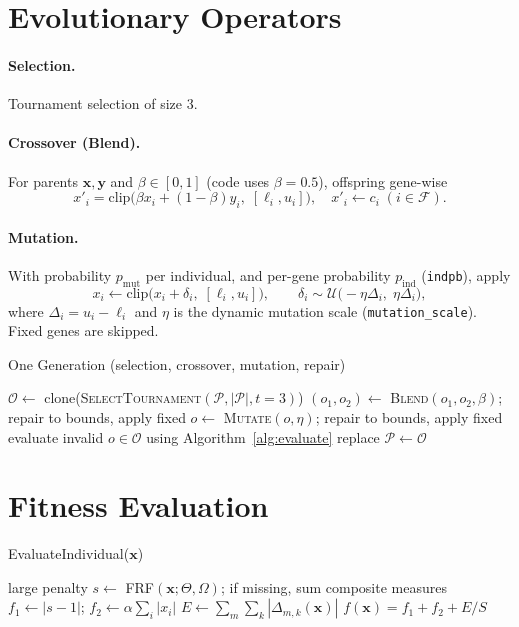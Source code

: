 \documentclass[12pt,a4paper]{article}
\begin{document}
\section{Evolutionary Operators}
\paragraph{Selection.} Tournament selection of size $3$.

\paragraph{Crossover (Blend).} For parents $\bm{x},\bm{y}$ and $\beta\in[0,1]$ (code uses $\beta=0.5$), offspring gene-wise
\[ x'_i = \mathrm{clip}\big(\beta x_i + (1-\beta) y_i,\; [\ell_i,u_i]\big), \quad x'_i \leftarrow c_i\; (i\in\mathcal{F}). \]

\paragraph{Mutation.} With probability $p_{\text{mut}}$ per individual, and per-gene probability $p_{\text{ind}}$ (\texttt{indpb}), apply
\[ x_i \leftarrow \mathrm{clip}\big(x_i + \delta_i,\;[\ell_i,u_i]\big), \qquad \delta_i \sim \mathcal{U}\big(-\eta\Delta_i,\;\eta\Delta_i\big), \]
where $\Delta_i=u_i-\ell_i$ and $\eta$ is the dynamic mutation scale (\texttt{mutation\_scale}). Fixed genes are skipped.

\begin{algorithm}[H]
\caption{One Generation (selection, crossover, mutation, repair)}
\begin{algorithmic}[1]
\State $\mathcal{O} \leftarrow$ clone(\textsc{SelectTournament}$(\mathcal{P},|\mathcal{P}|,t=3)$)
 \State $(o_1,o_2) \leftarrow$ \textsc{Blend}$(o_1,o_2,\beta)$; repair to bounds, apply fixed \EndIf
\EndFor
{}
 \State $o\leftarrow$ \textsc{Mutate}$(o,\eta)$; repair to bounds, apply fixed \EndIf
\EndFor
\State evaluate invalid $o\in\mathcal{O}$ using Algorithm~\ref{alg:evaluate}
\State replace $\mathcal{P}\leftarrow\mathcal{O}$
\end{algorithmic}
\end{algorithm}

\section{Fitness Evaluation}
\begin{algorithm}[H]
\caption{EvaluateIndividual($\bm{x}$)}\label{alg:evaluate}
\begin{algorithmic}[1]
 \State \Return large penalty \EndIf
\State $s \leftarrow$ \textsc{FRF}$(\bm{x};\Theta,\Omega)$; if missing, sum composite measures
\State $f_1\leftarrow |s-1|$; $f_2\leftarrow \alpha\sum_i |x_i|$
\State $E\leftarrow \sum_{m}\sum_{k} |\Delta_{m,k}(\bm{x})|$
\State \Return $f(\bm{x}) = f_1 + f_2 + E/S$
\end{algorithmic}
\end{algorithm}
\end{document}
